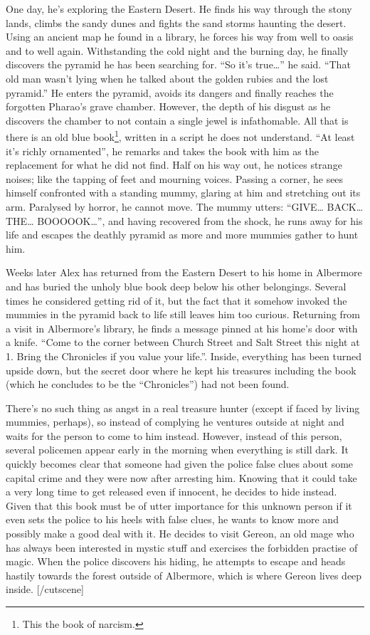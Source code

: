 \documentclass{gd-document}
\begin{document}
One day, he’s exploring the Eastern Desert. He finds his way through
the stony lands, climbs the sandy dunes and fights the sand storms
haunting the desert. Using an ancient map he found in a library, he
forces his way from well to oasis and to well again. Withstanding the
cold night and the burning day, he finally discovers the pyramid he
has been searching for. “So it’s true…” he said. “That old man wasn’t
lying when he talked about the golden rubies and the lost pyramid.”
He enters the pyramid, avoids its dangers and finally reaches the
forgotten Pharao’s grave chamber. However, the depth of his disgust as
he discovers the chamber to not contain a single jewel is
infathomable. All that is there is an old blue book\footnote{This the
  book of narcism.}, written in a
script he does not understand. “At least it’s richly ornamented”, he
remarks and takes the book with him as the replacement for what he did
not find. Half on his way out, he notices strange noises; like the
tapping of feet and mourning voices. Passing a corner, he sees himself
confronted with a standing mummy, glaring at him and stretching out
its arm. Paralysed by horror, he cannot move. The mummy utters: “GIVE…
BACK… THE… BOOOOOK…”, and having recovered from the shock, he runs away for
his life and escapes the deathly pyramid as more and more mummies
gather to hunt him.

Weeks later Alex has returned from the Eastern Desert to his home in
Albermore and has buried the unholy blue book deep below his other
belongings. Several times he considered getting rid of it, but the
fact that it somehow invoked the mummies in the pyramid back to life
still leaves him too curious. Returning from a visit in Albermore’s
library, he finds a message pinned at his home’s door with a
knife. “Come to the corner between Church Street and Salt Street this
night at 1. Bring the Chronicles if you value your life.”. Inside,
everything has been turned upside down, but the secret door where he
kept his treasures including the book (which he concludes to be the
“Chronicles”) had not been found.

There’s no such thing as angst in a real treasure hunter (except if
faced by living mummies, perhaps), so instead of complying he ventures
outside at night and waits for the person to come to him
instead. However, instead of this person, several policemen appear
early in the morning when everything is still dark. It quickly becomes
clear that someone had given the police false clues about some capital
crime and they were now after arresting him. Knowing that it could
take a very long time to get released even if innocent, he decides to
hide instead. Given that this book must be of utter importance for
this unknown person if it even sets the police to his heels with false
clues, he wants to know more and possibly make a good deal with it. He
decides to visit Gereon, an old mage who has always been interested in
mystic stuff and exercises the forbidden practise of magic. When the
police discovers his hiding, he attempts to escape and heads hastily
towards the forest outside of Albermore, which is where Gereon lives
deep inside.
[/cutscene]
\end{document}
